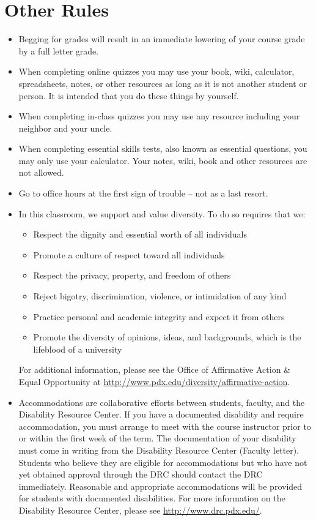 \documentclass[letterpaper,10pt]{article}
\begin{document}
\section{Other Rules}
\begin{itemize}


\item Begging for grades will result in an immediate lowering of your
  course grade by a full letter grade.
  
  \item When completing online quizzes you may use your book, wiki, calculator, spreadsheets, notes, or other resources as long as it is not another student or person.  It is intended that you do these things by yourself.
  
   \item  When completing in-class quizzes you may use any resource including your neighbor and your uncle.
  
   \item When completing essential skills tests, also known as essential questions, you may only use your calculator.  Your notes, wiki, book and other resources are not allowed.

\item Go to office hours at the first sign of trouble -- not as a last
  resort.

\item In this classroom, we support and value diversity.  To do so requires that we:
\begin{itemize}
   \item Respect the dignity and essential worth of all individuals
   \item Promote a culture of respect toward all individuals
    \item Respect the privacy, property, and freedom of others
    \item Reject bigotry, discrimination, violence, or intimidation of any kind
    \item Practice personal and academic integrity and expect it from others
   \item Promote the diversity of opinions, ideas, and backgrounds, which is
    the lifeblood of a university
\end{itemize}

 For additional information, please see the Office of Affirmative Action \& Equal Opportunity at \url{http://www.pdx.edu/diversity/affirmative-action}.


\item Accommodations are collaborative efforts between students, faculty, and the Disability Resource Center.  If you have a documented disability and require accommodation, you must arrange to meet with the course instructor prior to or within the first week of the term.  The documentation of your disability must come in writing from the Disability Resource Center (Faculty letter).  Students who believe they are eligible for accommodations but who have not yet obtained approval through the DRC should contact the DRC immediately.  Reasonable and appropriate accommodations will be provided for students with documented disabilities.  For more information on the Disability Resource Center, please see \url{http://www.drc.pdx.edu/}. 


\end{itemize}
\end{document}
